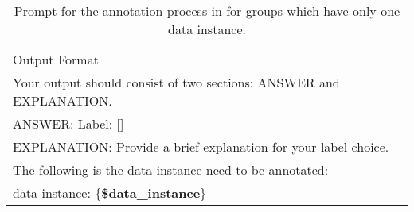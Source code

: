 \begin{table*}[h]
\begin{tabular}{@{}p{\textwidth}@{}}
        Output Format\\
        Your output should consist of two sections: ANSWER and EXPLANATION.\\
        ANSWER: Label: []\\
        EXPLANATION: Provide a brief explanation for your label choice.\\
        The following is the data instance need to be annotated:\\
        data-instance: \{\textbf{\$data\_instance}\}\\
        \hline
    \end{tabular}
    \caption{Prompt for the annotation process in \system for groups which have only one data instance.}
    \label{tab:main-prompt}
\end{table*}


